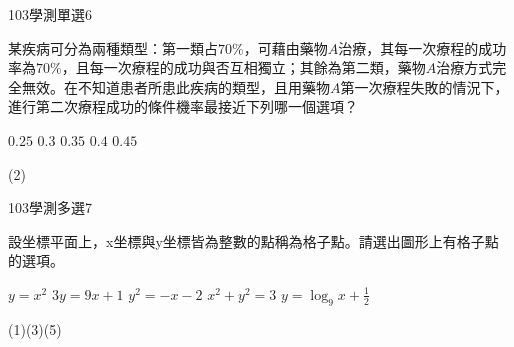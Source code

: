     \begin{QUESTION}
        \begin{ExamInfo}{103}{學測}{單選}{6}
        \end{ExamInfo}
        \begin{ExamAnsRateInfo}{33}{55}{22}{22}
        \end{ExamAnsRateInfo}
        \begin{QBODY}
            某疾病可分為兩種類型：第一類占$70\%$，可藉由藥物$A$治療，其每一次療程的成功率為$70\%$，且每一次療程的成功與否互相獨立；其餘為第二類，藥物$A$治療方式完全無效。在不知道患者所患此疾病的類型，且用藥物$A$第一次療程失敗的情況下，進行第二次療程成功的條件機率最接近下列哪一個選項？
                \begin{QOPS}
    				\QOP $0.25$
    				\QOP $0.3$
    				\QOP $0.35$
    				\QOP $0.4$
    				\QOP $0.45$
                \end{QOPS}
        \end{QBODY}
        \begin{QFROMS}
        \end{QFROMS}
        \begin{QTAGS}\end{QTAGS}
        \begin{QANS}
            (2)
        \end{QANS}
        \begin{QSOLLIST}
        \end{QSOLLIST}
        \begin{QEMPTYSPACE}
        \end{QEMPTYSPACE}
    \end{QUESTION}
    \begin{QUESTION}
        \begin{ExamInfo}{103}{學測}{多選}{7}
        \end{ExamInfo}
        \begin{ExamAnsRateInfo}{62}{89}{65}{32}
        \end{ExamAnsRateInfo}
        \begin{QBODY}
            設坐標平面上，x坐標與y坐標皆為整數的點稱為格子點。請選出圖形上有格子點的選項。
			\begin{QOPS}
				\QOP $y={{x}^{2}}$
				\QOP $3y=9x+1$
				\QOP ${{y}^{2}}=-x-2$
				\QOP ${{x}^{2}}+{{y}^{2}}=3$
				\QOP $y={{\log }_{9}}x+\frac{1}{2}$
			\end{QOPS}
        \end{QBODY}
        \begin{QFROMS}
        \end{QFROMS}
        \begin{QTAGS}\end{QTAGS}
        \begin{QANS}
            (1)(3)(5)
        \end{QANS}
        \begin{QSOLLIST}
        \end{QSOLLIST}
        \begin{QEMPTYSPACE}
        \end{QEMPTYSPACE}
    \end{QUESTION}

